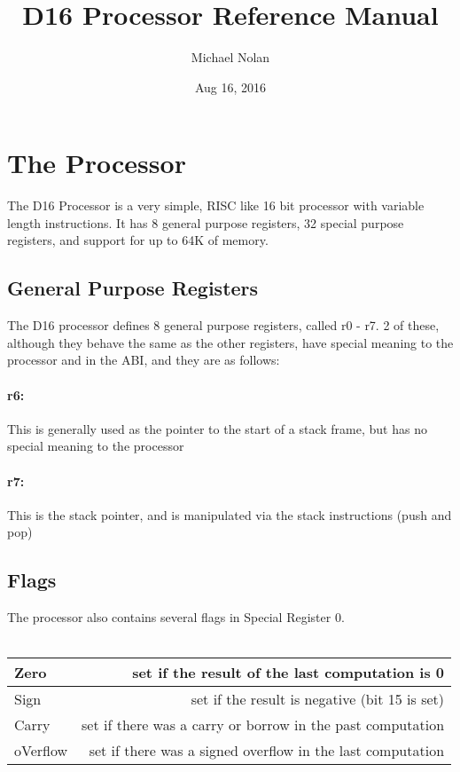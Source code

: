\documentclass{article}
\title{D16 Processor Reference Manual}
\date{Aug 16, 2016}
\author{Michael Nolan}
\begin{document}
	\maketitle
	\newpage
	\tableofcontents
	\newpage
	
	\section{The Processor}
	The D16 Processor is a very simple, RISC like 16 bit processor with variable length instructions. It has 8 general purpose registers, 32 special purpose registers, and support for up to 64K of memory.
	\subsection{General Purpose Registers}
	The D16 processor defines 8 general purpose registers, called r0 - r7. 2 of these, although they behave the same as the other registers, have special meaning to the processor and in the ABI, and they are as follows: \newline
		\paragraph{r6:} This is generally used as the pointer to the start of a stack frame, but has no special meaning to the processor
		\paragraph{r7:} This is the stack pointer, and is manipulated via the stack instructions (push and pop)
	\subsection{Flags}
		The processor also contains several flags in Special Register 0. \\ \\
		\begin{tabular}{| l | r |}
		\hline
			Zero & set if the result of the last computation is 0 \\ \hline
			Sign & set if the result is negative (bit 15 is set) \\ \hline
			Carry & set if there was a carry or borrow in the past computation \\ \hline
			oVerflow & set if there was a signed overflow in the last computation \\ \hline
		\end{tabular}
\end{document}
